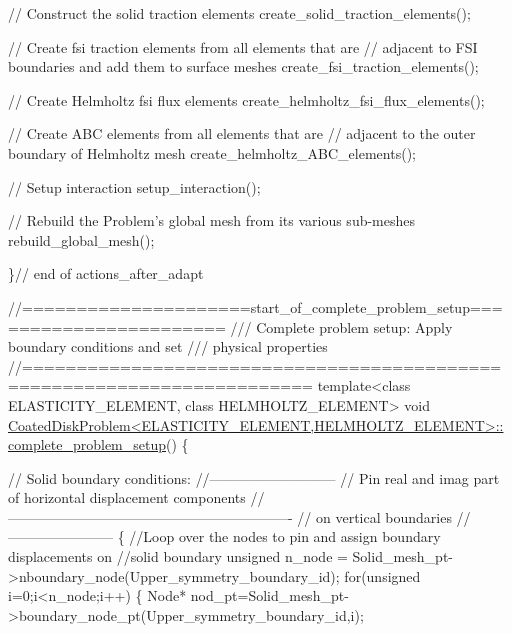 \begin{DoxyCodeInclude}
{ \textcolor{comment}{// Construct the solid traction elements}
 create\_solid\_traction\_elements(); 

 \textcolor{comment}{// Create fsi traction elements from all elements that are }
 \textcolor{comment}{// adjacent to FSI boundaries and add them to surface meshes}
 create\_fsi\_traction\_elements();
 
 \textcolor{comment}{// Create Helmholtz fsi flux elements}
 create\_helmholtz\_fsi\_flux\_elements();
 
 \textcolor{comment}{// Create ABC elements from all elements that are }
 \textcolor{comment}{// adjacent to the outer boundary of Helmholtz mesh}
 create\_helmholtz\_ABC\_elements();
   
 \textcolor{comment}{// Setup interaction}
 setup\_interaction();
 
 \textcolor{comment}{// Rebuild the Problem's global mesh from its various sub-meshes}
 rebuild\_global\_mesh();
 
\}\textcolor{comment}{// end of actions\_after\_adapt}




\textcolor{comment}{//=====================start\_of\_complete\_problem\_setup=======================}\textcolor{comment}{}
\textcolor{comment}{/// Complete problem setup: Apply boundary conditions and set}
\textcolor{comment}{/// physical properties}
\textcolor{comment}{}\textcolor{comment}{//========================================================================}
\textcolor{keyword}{template}<\textcolor{keyword}{class} ELASTICITY\_ELEMENT, \textcolor{keyword}{class} HELMHOLTZ\_ELEMENT>
\textcolor{keywordtype}{void} \hyperlink{classCoatedDiskProblem_a4d63252d3916bda71f28b637d6590627}{CoatedDiskProblem<ELASTICITY\_ELEMENT,HELMHOLTZ\_ELEMENT>::}
\hyperlink{classCoatedDiskProblem_a4d63252d3916bda71f28b637d6590627}{complete\_problem\_setup}()
\{

 \textcolor{comment}{// Solid boundary conditions:}
 \textcolor{comment}{//---------------------------}
 \textcolor{comment}{// Pin real and imag part of horizontal displacement components }
 \textcolor{comment}{//-------------------------------------------------------------}
 \textcolor{comment}{// on vertical boundaries}
 \textcolor{comment}{//-----------------------}
 \{  
  \textcolor{comment}{//Loop over the nodes to pin and assign boundary displacements on }
  \textcolor{comment}{//solid boundary}
  \textcolor{keywordtype}{unsigned} n\_node = Solid\_mesh\_pt->nboundary\_node(Upper\_symmetry\_boundary\_id);
  \textcolor{keywordflow}{for}(\textcolor{keywordtype}{unsigned} i=0;i<n\_node;i++)
   \{
    Node* nod\_pt=Solid\_mesh\_pt->boundary\_node\_pt(Upper\_symmetry\_boundary\_id,i);
    
}
\end{DoxyCodeInclude}
